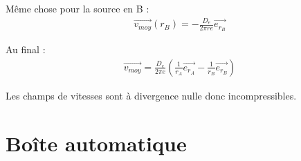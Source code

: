 \documentclass{report}
\begin{document}
Même chose pour la source en B :
\begin{align*}
	\vec{v_{moy}}(r_B) = -\frac{D_e}{2\pi r e}\vec{e_{r_B}}
\end{align*}

Au final : 
\begin{align*}
	\vec{v_{moy}} = \frac{D_e}{2\pi e}\left( \frac{1}{r_A}\vec{e_{r_A}} - \frac{1}{r_B}\vec{e_{r_B}}\right) 
\end{align*}

Les champs de vitesses sont à divergence nulle donc incompressibles.

\newpage

\section*{Boîte automatique}
\end{document}
